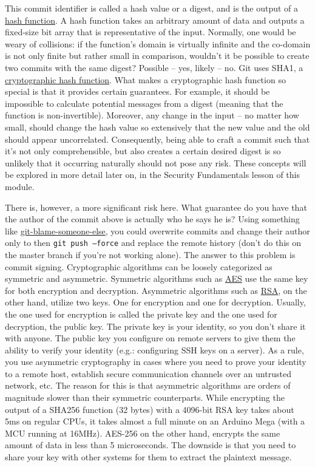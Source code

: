 This commit identifier is called a hash value or a digest, and is the output of
a \href{https://en.wikipedia.org/wiki/Hash_function}{hash function}. A hash
function takes an arbitrary amount of data and outputs a fixed-size bit array
that is representative of the input. Normally, one would be weary of collisions:
if the function's domain is virtually infinite and the co-domain is not only
finite but rather small in comparison, wouldn't it be possible to create two
commits with the same digest? Possible – yes, likely – no. Git uses SHA1, a
\href{https://en.wikipedia.org/wiki/Cryptographic_hash_function}{cryptographic
hash function}. What makes a cryptographic hash function so special is that it
provides certain guarantees. For example, it should be impossible to calculate
potential messages from a digest (meaning that the function is non-invertible).
Moreover, any change in the input – no matter how small, should change the hash
value so extensively that the new value and the old should appear uncorrelated.
Consequently, being able to craft a commit such that it's not only
comprehensible, but also creates a certain desired digest is so unlikely that it
occurring naturally should not pose any risk. These concepts will be explored in
more detail later on, in the Security Fundamentals lesson of this module.

There is, however, a more significant risk here. What guarantee do you have that
the author of the commit above is actually who he says he is? Using something
like \href{https://github.com/jayphelps/git-blame-someone-else}
{git-blame-someone-else}, you could overwrite commits and change their author
only to then \texttt{git push --force} and replace the remote history (don't do
this on the master branch if you're not working alone). The answer to this
problem is commit signing. Cryptographic algorithms can be loosely categorized
as symmetric and asymmetric. Symmetric algorithms such as
\href{https://en.wikipedia.org/wiki/Advanced_Encryption_Standard}{AES} use the
same key for both encryption and decryption. Asymmetric algorithms such as
\href{https://en.wikipedia.org/wiki/RSA_cryptosystem}{RSA}, on the other hand,
utilize two keys. One for encryption and one for decryption. Usually, the one
used for encryption is called the private key and the one used for decryption,
the public key. The private key is your identity, so you don't share it with
anyone. The public key you configure on remote servers to give them the ability
to verify your identity (e.g.: configuring SSH keys on a server). As a rule, you
use asymmetric cryptography in cases where you need to prove your identity to a
remote host, establish secure communication channels over an untrusted network,
etc. The reason for this is that asymmetric algorithms are orders of magnitude
slower than their symmetric counterparts. While encrypting the output of a
SHA256 function (32 bytes) with a 4096-bit RSA key takes about 5ms on regular
CPUs, it takes almost a full minute on an Arduino Mega (with a MCU running at
16MHz). AES-256 on the other hand, encrypts the same amount of data in less than
5 microseconds. The downside is that you need to share your key with other
systems for them to extract the plaintext message.

